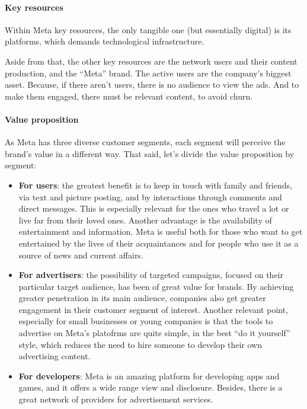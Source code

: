 \paragraph{Key resources}
Within Meta key resources, the only tangible one (but essentially
digital) is its platforms, which demands technological infrastructure.

Aside from that, the other key resources are the network users and
their content production, and the ``Meta'' brand. The active users are
the company's biggest asset. Because, if there aren't users, there is
no audience to view the ads. And to make them engaged, there must be
relevant content, to avoid churn.

\paragraph{Value proposition}
As Meta has three diverse customer segments, each segment will
perceive the brand's value in a different way. That said, let's divide
the value proposition by segment:

\begin{itemize}
\item \textbf{For users}: the greatest benefit is to keep in touch
  with family and friends, via text and picture posting, and by
  interactions through comments and direct messages. This is
  especially relevant for the ones who travel a lot or live far from
  their loved ones. Another advantage is the availability of
  entertainment and information. Meta is useful both for those who
  want to get entertained by the lives of their acquaintances and for
  people who use it as a source of news and current affairs.

\item \textbf{For advertisers}: the possibility of targeted campaigns,
  focused on their particular target audience, has been of great value
  for brands. By achieving greater penetration in its main audience,
  companies also get greater engagement in their customer segment of
  interest. Another relevant point, especially for small businesses or
  young companies is that the tools to advertise on Meta's platofrms
  are quite simple, in the best ``do it yourself'' style, which
  reduces the need to hire someone to develop their own advertising
  content.

\item \textbf{For developers}: Meta is an amazing platform for
  developing apps and games, and it offers a wide range view and
  disclosure. Besides, there is a great network of providers for
  advertisement services.
\end{itemize}

